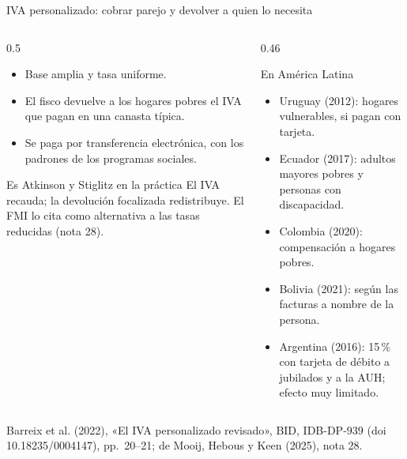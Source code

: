 \documentclass[aspectratio=169,11pt]{beamer}
\newcommand{\fuente}[1]{\par\vfill{\small\color{cGris}#1\par}}
\begin{document}
\begin{frame}{IVA personalizado: cobrar parejo y devolver a quien lo necesita}
  \begin{columns}[T]
    \begin{column}{0.5\textwidth}
      \begin{itemize}
        \item Base amplia y tasa uniforme.
        \item El fisco devuelve a los hogares pobres el IVA que pagan en una canasta típica.
        \item Se paga por transferencia electrónica, con los padrones de los programas sociales.
      \end{itemize}
      \pause
      \begin{block}{Es Atkinson y Stiglitz en la práctica}
        El IVA recauda; la devolución focalizada redistribuye. El FMI lo cita como alternativa a las tasas reducidas (nota 28).
      \end{block}
    \end{column}
    \begin{column}{0.46\textwidth}
      \pause
      \begin{block}{En América Latina}
        \small
        \begin{itemize}
          \item Uruguay (2012): hogares vulnerables, si pagan con tarjeta.
          \item Ecuador (2017): adultos mayores pobres y personas con discapacidad.
          \item Colombia (2020): compensación a hogares pobres.
          \item Bolivia (2021): según las facturas a nombre de la persona.
          \item Argentina (2016): 15\,\% con tarjeta de débito a jubilados y a la AUH; efecto muy limitado.
        \end{itemize}
      \end{block}
    \end{column}
  \end{columns}
  \fuente{Barreix et al. (2022), «El IVA personalizado revisado», BID, IDB-DP-939 (doi 10.18235/0004147), pp.~20--21; de Mooij, Hebous y Keen (2025), nota 28.}
\end{frame}
\end{document}

